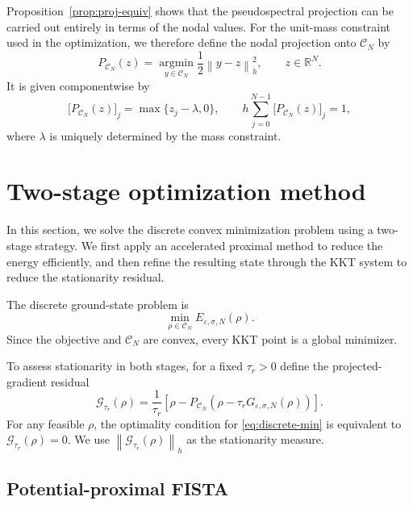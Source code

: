 \documentclass[11pt]{article}
\newcommand{\R}{\mathbb{R}}
\newcommand{\CN}{\mathcal{C}_N}
\newcommand{\eps}{\varepsilon}
\newcommand{\sig}{\sigma}
\newcommand{\norm}[1]{\left\|#1\right\|}
\theoremstyle{plain}
\theoremstyle{definition}
\numberwithin{equation}{section}
\begin{document}
Proposition~\ref{prop:proj-equiv} shows that the pseudospectral
projection can be carried out entirely in terms of the nodal values.
For the unit-mass constraint used in the optimization, we therefore
define the nodal projection onto $\CN$ by
\begin{equation}
\label{eq:nodal-projection}
P_{\CN}(z)
=
\operatorname*{argmin}_{y\in\CN}
\frac12\norm{y-z}_h^2,
\qquad z\in\R^N.
\end{equation}
It is given componentwise by
\begin{equation}
\label{eq:simplex-form}
\bigl[P_{\CN}(z)\bigr]_j
=
\max\{z_j-\lambda,0\},
\qquad
h\sum_{j=0}^{N-1}
\bigl[P_{\CN}(z)\bigr]_j
=
1,
\end{equation}
where $\lambda$ is uniquely determined by the mass constraint.

\section{Two-stage optimization method}
\label{sec:opt}

In this section, we solve the discrete convex minimization problem
using a two-stage strategy. We first apply an accelerated proximal
method to reduce the energy efficiently, and then refine the resulting
state through the KKT system to reduce the stationarity residual.

The discrete ground-state problem is
\begin{equation}
\label{eq:discrete-min}
\min_{\rho\in\CN}E_{\eps,\sig,N}(\rho).
\end{equation}
Since the objective and $\CN$ are convex, every KKT point is a global
minimizer.

To assess stationarity in both stages, for a fixed $\tau_r>0$ define
the projected-gradient residual
\begin{equation}
\label{eq:pg-map}
\mathcal G_{\tau_r}(\rho)
=
\frac{1}{\tau_r}
\left[
\rho
-
P_{\CN}
\left(
\rho-\tau_rG_{\eps,\sig,N}(\rho)
\right)
\right].
\end{equation}
For any feasible $\rho$, the optimality condition for
\eqref{eq:discrete-min} is equivalent to
$\mathcal G_{\tau_r}(\rho)=0$. We use
$\norm{\mathcal G_{\tau_r}(\rho)}_h$ as the stationarity measure.


\subsection{Potential-proximal FISTA}
\label{subsec:potential_FISTA}
\end{document}

